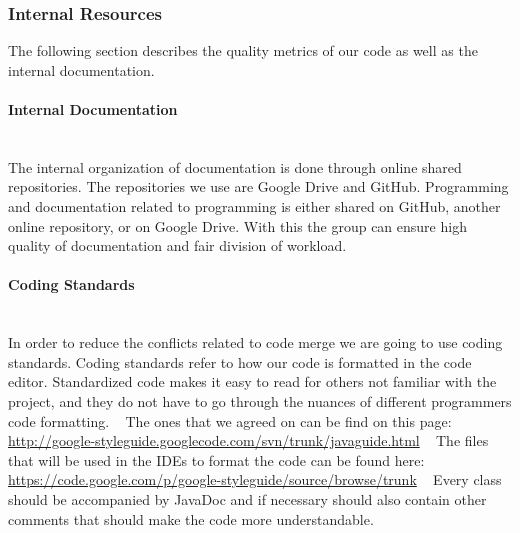 \documentclass[../document.tex]{subfiles}
\begin{document}
\subsubsection{Internal Resources}
The following section describes the quality metrics of our code as well as the internal documentation.

\paragraph{Internal Documentation} \ \\
The internal organization of documentation is done through online shared repositories. The repositories we use are Google Drive and GitHub. Programming and documentation related to programming is either shared on GitHub, another online repository, or on Google Drive. With this the group can ensure high quality of documentation and fair division of workload.

\paragraph{Coding Standards} \ \\
In order to reduce the conflicts related to code merge we are going to use coding standards. Coding standards refer to how our code is formatted in the code editor. Standardized code makes it easy to read for others not familiar with the project, and they do not have to go through the nuances of different programmers code formatting.
\newline \ \newline
The ones that we agreed on can be find on this page: \newline
\url{http://google-styleguide.googlecode.com/svn/trunk/javaguide.html}
\newline \ \newline
The files that will be used in the IDEs to format the code can be found here: \newline
\url{https://code.google.com/p/google-styleguide/source/browse/trunk}
\newline \ \newline
Every class should be accompanied by JavaDoc and if necessary should also contain other comments that should make the code more understandable. 
\end{document}

